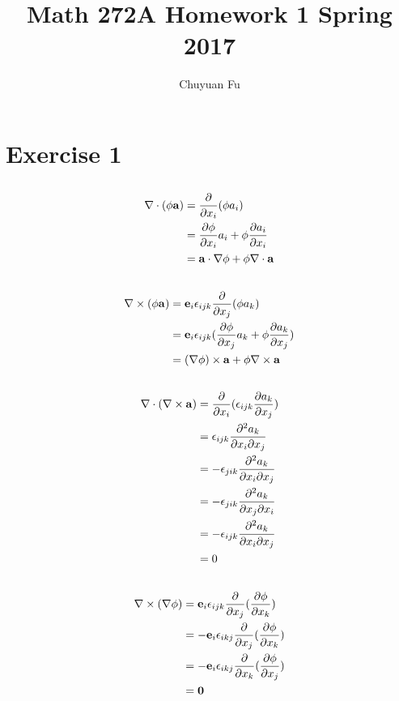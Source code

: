 \documentclass[12pt]{article}
\newcommand{\ba}{{\bf a}}
\newcommand{\ee}{{\bf e}}
\newcommand{\bnabla}{{\bf \nabla}}
\newcommand{\pr}{{\partial}}
\begin{document}
\title{Math 272A Homework 1 Spring 2017}
\author{Chuyuan Fu}
\date{}

\maketitle

\section{Exercise 1}
\subsection{}
\begin{align*}
\bnabla\cdot(\phi\ba) &= \frac{\pr}{\pr x_i} (\phi a_i) \\
	&= \frac{\pr \phi}{\pr x_i} a_i + \phi\frac{\pr a_i}{\pr x_i} \\
	&= \ba \cdot \bnabla\phi +\phi \bnabla\cdot\ba
\end{align*}


\subsection{}
\begin{align*}
\bnabla\times(\phi\ba) &=\ee_i\epsilon_{ijk}\frac{\pr}{\pr x_j} (\phi a_k)\\
	 &=\ee_i\epsilon_{ijk} (\frac{\pr \phi}{\pr x_j}  a_k   + \phi \frac{\pr a_k}{\pr x_j})\\
	&= (\bnabla\phi)\times\ba +\phi \bnabla\times\ba
\end{align*}


\subsection{}
\begin{align*}
\bnabla\cdot(\bnabla\times\ba) &= \frac{\pr}{\pr x_i}(\epsilon_{ijk}\frac{\pr a_k}{\pr x_j} )\\
	&= \epsilon_{ijk}\frac{\pr^2 a_k}{\pr x_i\pr x_j}\\
	&= -\epsilon_{jik}\frac{\pr^2 a_k}{\pr x_i\pr x_j}\\
	&= -\epsilon_{jik}\frac{\pr^2 a_k}{\pr x_j\pr x_i}\\
	&= -\epsilon_{ijk}\frac{\pr^2 a_k}{\pr x_i\pr x_j}\\
	&=0
\end{align*}


\subsection{}
\begin{align*}
\bnabla\times(\bnabla\phi) &=  \ee_i\epsilon_{ijk}\frac{\pr}{\pr x_j} (\frac{\pr \phi}{\pr x_k})\\
 &=  - \ee_i\epsilon_{ikj}\frac{\pr}{\pr x_j} (\frac{\pr \phi}{\pr x_k})\\
 &= - \ee_i\epsilon_{ikj}\frac{\pr}{\pr x_k} (\frac{\pr \phi}{\pr x_j})\\
&= {\bf 0}
\end{align*}
\end{document}
